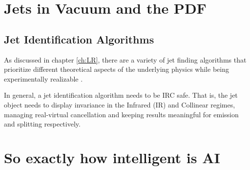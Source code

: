 \chapter{Jets in Vacuum and the PDF}
\section{Jet Identification Algorithms}
\label{sec:toy_jet_id}
As discussed in chapter \ref{ch:LR}, there are a variety of jet finding algorithms that prioritize different theoretical aspects of the underlying physics while being experimentally realizable \cite{Dokshitzer1997} \cite{Atkin2015}. 

In general, a jet identification algorithm needs to be IRC safe. 
That is, the jet object needs to display invariance in the Infrared (IR) and Collinear regimes, managing real-virtual cancellation and keeping results meaningful for emission and splitting respectively. 

\chapter{So exactly how intelligent is AI}


